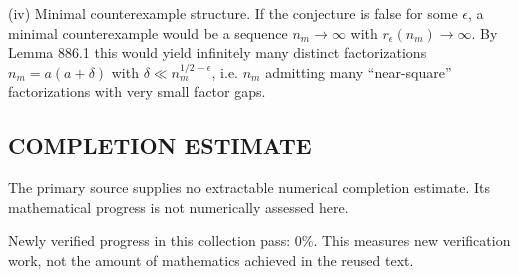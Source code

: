 (iv) Minimal counterexample structure.
If the conjecture is false for some $\epsilon$, a minimal counterexample would be a sequence $n_m\to\infty$ with $r_{\epsilon}(n_m)\to\infty$. By Lemma 886.1 this would yield infinitely many distinct factorizations $n_m=a(a+\delta)$ with $\delta\ll n_m^{1/2-\epsilon}$, i.e. $n_m$ admitting many “near-square” factorizations with very small factor gaps.


\subsection*{COMPLETION ESTIMATE}
The primary source supplies no extractable numerical completion estimate. Its mathematical progress is not numerically assessed here.

Newly verified progress in this collection pass: $0\%$. This measures new verification work, not the amount of mathematics achieved in the reused text.
